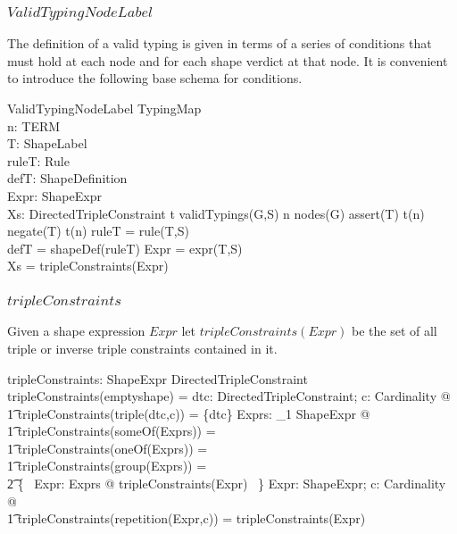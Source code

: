\documentclass{article}
\begin{document}
\subsubsection{$ValidTypingNodeLabel$}
The definition of a valid typing is given in terms of a series of conditions that must hold at each node and for each shape verdict at that node.
It is convenient to introduce the following base schema for conditions.
\begin{schema}{ValidTypingNodeLabel}
	TypingMap \\
	n: TERM \\
	T: ShapeLabel \\
	ruleT: Rule \\
	defT: ShapeDefinition \\
	Expr: ShapeExpr \\
	Xs: \finset DirectedTripleConstraint
\where
	t \in validTypings(G,S)
\also
	n \in nodes(G)
\also
	assert(T) \in t(n) \lor negate(T) \in t(n)
\also
	ruleT = rule(T,S) \\
	defT = shapeDef(ruleT)
\also
	Expr = expr(T,S) \\
	Xs = tripleConstraints(Expr)
\end{schema}

\subsubsection{$tripleConstraints$}
Given a shape expression $Expr$ let $tripleConstraints(Expr)$ be the set of all triple or inverse triple constraints contained in it.
\begin{axdef}
	tripleConstraints: ShapeExpr \fun \finset DirectedTripleConstraint
\where
	tripleConstraints(emptyshape) = \emptyset
\also
	\forall dtc: DirectedTripleConstraint; c: Cardinality @ \\
\t1		tripleConstraints(triple(dtc,c)) = \{dtc\}
\also
	\forall Exprs: \seq_1 ShapeExpr @ \\
\t1		tripleConstraints(someOf(Exprs)) = \\
\t1		tripleConstraints(oneOf(Exprs)) = \\
\t1		tripleConstraints(group(Exprs)) = \\
\t2			\bigcup \{~ Expr: \ran Exprs @ tripleConstraints(Expr) ~\}
\also
	\forall Expr: ShapeExpr; c: Cardinality @ \\
\t1		tripleConstraints(repetition(Expr,c)) = tripleConstraints(Expr)
\end{axdef}
\end{document}
